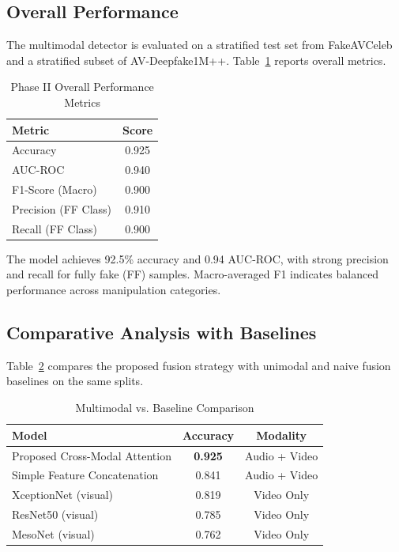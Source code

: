 \subsection{Overall Performance}
The multimodal detector is evaluated on a stratified test set from FakeAVCeleb and a stratified subset of AV-Deepfake1M++. Table~\ref{tab:phase2_overall} reports overall metrics.

\begin{table}[!htbp]
\centering
\caption{Phase II Overall Performance Metrics}
\label{tab:phase2_overall}
\begin{tabular}{l c}
\toprule
Metric & Score \\
\midrule
Accuracy & 0.925 \\
AUC-ROC & 0.940 \\
F1-Score (Macro) & 0.900 \\
Precision (FF Class) & 0.910 \\
Recall (FF Class) & 0.900 \\
\bottomrule
\end{tabular}
\end{table}


The model achieves 92.5\% accuracy and 0.94 AUC-ROC, with strong precision and recall for fully fake (FF) samples. Macro-averaged F1 indicates balanced performance across manipulation categories.

\subsection{Comparative Analysis with Baselines}
Table~\ref{tab:phase2_baselines} compares the proposed fusion strategy with unimodal and naive fusion baselines on the same splits.

\begin{table}[!htbp]
\centering
\caption{Multimodal vs. Baseline Comparison}
\label{tab:phase2_baselines}
\begin{tabular}{l c c}
\toprule
Model & Accuracy & Modality \\
\midrule
Proposed Cross-Modal Attention & \textbf{0.925} & Audio + Video \\
Simple Feature Concatenation & 0.841 & Audio + Video \\
XceptionNet (visual) & 0.819 & Video Only \\
ResNet50 (visual) & 0.785 & Video Only \\
MesoNet (visual) & 0.762 & Video Only \\
\bottomrule
\end{tabular}
\end{table}

